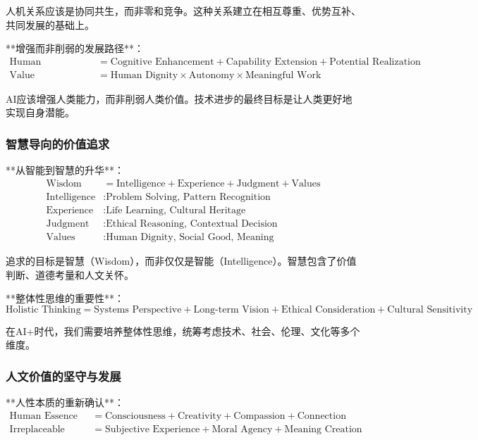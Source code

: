 人机关系应该是协同共生，而非零和竞争。这种关系建立在相互尊重、优势互补、共同发展的基础上。

**增强而非削弱的发展路径**：
\begin{align}
\text{Human Augmentation} &= \text{Cognitive Enhancement} + \text{Capability Extension} + \text{Potential Realization} \\
\text{Value Preservation} &= \text{Human Dignity} \times \text{Autonomy} \times \text{Meaningful Work}
\end{align}

AI应该增强人类能力，而非削弱人类价值。技术进步的最终目标是让人类更好地实现自身潜能。

\subsubsection{智慧导向的价值追求} %

**从智能到智慧的升华**：
\begin{align}
\text{Wisdom} &= \text{Intelligence} + \text{Experience} + \text{Judgment} + \text{Values} \\
\text{Intelligence} &: \text{Problem Solving, Pattern Recognition} \\
\text{Experience} &: \text{Life Learning, Cultural Heritage} \\
\text{Judgment} &: \text{Ethical Reasoning, Contextual Decision} \\
\text{Values} &: \text{Human Dignity, Social Good, Meaning}
\end{align}

追求的目标是智慧（Wisdom），而非仅仅是智能（Intelligence）。智慧包含了价值判断、道德考量和人文关怀。

**整体性思维的重要性**：
\begin{equation}
\text{Holistic Thinking} = \text{Systems Perspective} + \text{Long-term Vision} + \text{Ethical Consideration} + \text{Cultural Sensitivity}
\end{equation}

在AI+时代，我们需要培养整体性思维，统筹考虑技术、社会、伦理、文化等多个维度。

\subsubsection{人文价值的坚守与发展} %

**人性本质的重新确认**：
\begin{align}
\text{Human Essence} &= \text{Consciousness} + \text{Creativity} + \text{Compassion} + \text{Connection} \\
\text{Irreplaceable Value} &= \text{Subjective Experience} + \text{Moral Agency} + \text{Meaning Creation}
\end{align}

